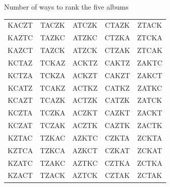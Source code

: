 \documentclass[10pt]{beamer}
\begin{document}
\begin{frame}{Number of ways to rank the five albums}
\begin{center}
\begin{tabular}{ccccc}
{\color{blue!70!black}KACZT} & {\color{orange!80!black}TACZK} & {\color{green!45!black}ATCZK} & {\color{red!70!black}CTAZK} & {\color{purple!70!black}ZTACK} \\
{\color{blue!70!black}KAZTC} & {\color{orange!80!black}TAZKC} & {\color{green!45!black}ATZKC} & {\color{red!70!black}CTZKA} & {\color{purple!70!black}ZTCKA} \\
{\color{blue!70!black}KAZCT} & {\color{orange!80!black}TAZCK} & {\color{green!45!black}ATZCK} & {\color{red!70!black}CTZAK} & {\color{purple!70!black}ZTCAK} \\
{\color{blue!70!black}KCTAZ} & {\color{orange!80!black}TCKAZ} & {\color{green!45!black}ACKTZ} & {\color{red!70!black}CAKTZ} & {\color{purple!70!black}ZAKTC} \\
{\color{blue!70!black}KCTZA} & {\color{orange!80!black}TCKZA} & {\color{green!45!black}ACKZT} & {\color{red!70!black}CAKZT} & {\color{purple!70!black}ZAKCT} \\
{\color{blue!70!black}KCATZ} & {\color{orange!80!black}TCAKZ} & {\color{green!45!black}ACTKZ} & {\color{red!70!black}CATKZ} & {\color{purple!70!black}ZATKC} \\
{\color{blue!70!black}KCAZT} & {\color{orange!80!black}TCAZK} & {\color{green!45!black}ACTZK} & {\color{red!70!black}CATZK} & {\color{purple!70!black}ZATCK} \\
{\color{blue!70!black}KCZTA} & {\color{orange!80!black}TCZKA} & {\color{green!45!black}ACZKT} & {\color{red!70!black}CAZKT} & {\color{purple!70!black}ZACKT} \\
{\color{blue!70!black}KCZAT} & {\color{orange!80!black}TCZAK} & {\color{green!45!black}ACZTK} & {\color{red!70!black}CAZTK} & {\color{purple!70!black}ZACTK} \\
{\color{blue!70!black}KZTAC} & {\color{orange!80!black}TZKAC} & {\color{green!45!black}AZKTC} & {\color{red!70!black}CZKTA} & {\color{purple!70!black}ZCKTA} \\
{\color{blue!70!black}KZTCA} & {\color{orange!80!black}TZKCA} & {\color{green!45!black}AZKCT} & {\color{red!70!black}CZKAT} & {\color{purple!70!black}ZCKAT} \\
{\color{blue!70!black}KZATC} & {\color{orange!80!black}TZAKC} & {\color{green!45!black}AZTKC} & {\color{red!70!black}CZTKA} & {\color{purple!70!black}ZCTKA} \\
{\color{blue!70!black}KZACT} & {\color{orange!80!black}TZACK} & {\color{green!45!black}AZTCK} & {\color{red!70!black}CZTAK} & {\color{purple!70!black}ZCTAK} \\

\end{tabular}
\end{center}
\end{frame}
\end{document}
